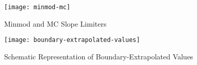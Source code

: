 \begin{figure}[h]
        \centering
        \texttt{[image: minmod-mc]}
        \caption{Minmod and MC Slope Limiters}
\end{figure}
\begin{figure}[h]
        \centering
        \texttt{[image: boundary-extrapolated-values]}
        \caption{Schematic Representation of Boundary-Extrapolated Values}
\end{figure}
